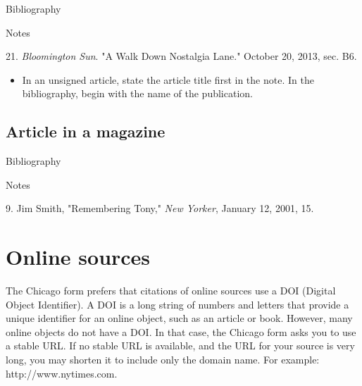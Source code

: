 \begin{center}{Bibliography}\end{center} 
\begin{singlespace}
\noindent{}
\end{singlespace}

\begin{center}{Notes}\end{center} 
\begin{singlespace}
\noindent\hspace{1.2cm}21. \emph{Bloomington
Sun}. "A Walk Down Nostalgia Lane." October 20, 2013, sec. B6.
\end{singlespace}

\begin{itemize}\item In an unsigned article, state the article title first in
the note. In the bibliography, begin with the name of the
publication.\end{itemize}

\subsection{Article in a magazine}

\begin{center}{Bibliography}\end{center} 
\begin{singlespace}
\noindent{}
\end{singlespace}

\begin{center}{Notes}\end{center} 
\begin{singlespace}
\noindent\hspace{1.2cm}9. Jim Smith,
"Remembering Tony," \emph{New Yorker}, January 12, 2001, 15.
\end{singlespace}

\section{Online sources}

The Chicago form prefers that citations of online sources use a DOI (Digital
Object Identifier). A DOI is a long string of numbers and letters that provide a
unique identifier for an online object,  such as an article or book. However,
many online objects do not have a DOI. In that case, the Chicago  form asks you
to use a stable URL. If no stable URL is available, and the URL for your source
is very long, you may shorten it to include only the domain name. For example:
http://www.nytimes.com.

